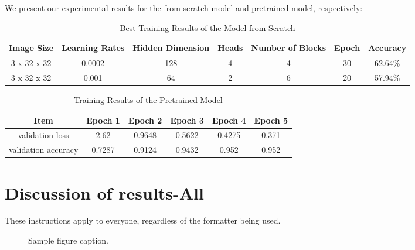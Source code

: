 \documentclass{article} %
\begin{document}
We present our experimental results for the from-scratch model and pretrained model, respectively:


\begin{table}[ht]
  \centering
    \begin{tabular}{ c | c | c | c | c  | c | c }
      \hline
      Image Size & Learning Rates & Hidden Dimension & Heads & Number of Blocks & Epoch & Accuracy \\ \hline
      3 x 32 x 32 & 0.0002 & 128 & 4 & 4 & 30 & 62.64\% \\ \hline
      3 x 32 x 32 & 0.001 & 64 & 2 & 6 & 20 & 57.94\% \\ \hline
    \end{tabular}
    \caption{Best Training Results of the Model from Scratch}
  \label{tab:my_label}
\end{table}


\begin{table}[ht]
  \centering
    \begin{tabular}{ c | c | c | c | c  | c }
      \hline
      Item & Epoch 1 & Epoch 2 & Epoch 3 & Epoch 4 & Epoch 5 \\ \hline
      validation loss & 2.62 & 0.9648 & 0.5622 & 0.4275 & 0.371\\ \hline
      validation accuracy & 0.7287  & 0.9124 & 0.9432 & 0.952 & 0.952 \\ \hline
    \end{tabular}
    \caption{Training Results of the Pretrained Model}
  \label{tab:my_label}
\end{table}

\section{Discussion of results-All}
\label{others}

These instructions apply to everyone, regardless of the formatter being used.

\begin{figure}[h]
\begin{center}
\fbox{\rule[-.5cm]{0cm}{4cm} \rule[-.5cm]{4cm}{0cm}}
\end{center}
\caption{Sample figure caption.}
\end{figure}
\end{document}
